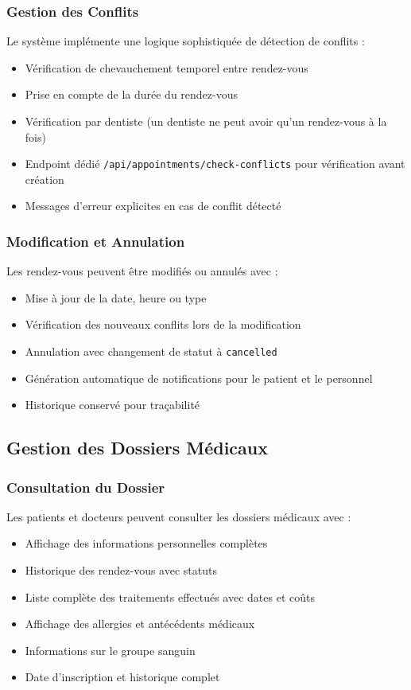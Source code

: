 \documentclass[12pt,a4paper]{report}
\begin{document}
\subsubsection{Gestion des Conflits}

Le système implémente une logique sophistiquée de détection de conflits :
\begin{itemize}
    \item Vérification de chevauchement temporel entre rendez-vous
    \item Prise en compte de la durée du rendez-vous
    \item Vérification par dentiste (un dentiste ne peut avoir qu'un rendez-vous à la fois)
    \item Endpoint dédié \texttt{/api/appointments/check-conflicts} pour vérification avant création
    \item Messages d'erreur explicites en cas de conflit détecté
\end{itemize}

\subsubsection{Modification et Annulation}

Les rendez-vous peuvent être modifiés ou annulés avec :
\begin{itemize}
    \item Mise à jour de la date, heure ou type
    \item Vérification des nouveaux conflits lors de la modification
    \item Annulation avec changement de statut à \texttt{cancelled}
    \item Génération automatique de notifications pour le patient et le personnel
    \item Historique conservé pour traçabilité
\end{itemize}

\subsection{Gestion des Dossiers Médicaux}

\subsubsection{Consultation du Dossier}

Les patients et docteurs peuvent consulter les dossiers médicaux avec :
\begin{itemize}
    \item Affichage des informations personnelles complètes
    \item Historique des rendez-vous avec statuts
    \item Liste complète des traitements effectués avec dates et coûts
    \item Affichage des allergies et antécédents médicaux
    \item Informations sur le groupe sanguin
    \item Date d'inscription et historique complet
\end{itemize}
\end{document}
